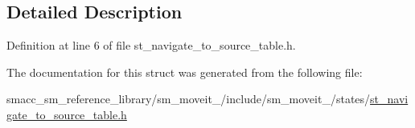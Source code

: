 \subsection{Detailed Description}


Definition at line 6 of file st\+\_\+navigate\+\_\+to\+\_\+source\+\_\+table.\+h.



The documentation for this struct was generated from the following file\+:\begin{DoxyCompactItemize}
\item 
smacc\+\_\+sm\+\_\+reference\+\_\+library/sm\+\_\+moveit\+\_/include/sm\+\_\+moveit\+\_/states/\hyperlink{st__navigate__to__source__table_8h}{st\+\_\+navigate\+\_\+to\+\_\+source\+\_\+table.\+h}\end{DoxyCompactItemize}
